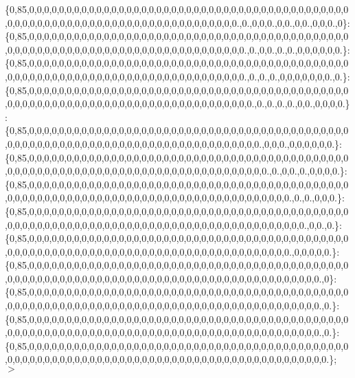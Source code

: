 \{0,85,0,0,0,0,0,0,0,0,0,0,0,0,0,0,0,0,0,0,0,0,0,0,0,0,0,0,0,0,0,0,0,0,0,0,0,0,0,0,0,0,0,0,0,0,0,0,0,0,0,0,0,0,0,0,0,0,0,0,0,0,0,0,0,0,0,0,0,0,0,0,0,0,0,0.,0.,0,0,0.,0,0.,0,0.,0,0,0.,0\}\+: \{0,85,0,0,0,0,0,0,0,0,0,0,0,0,0,0,0,0,0,0,0,0,0,0,0,0,0,0,0,0,0,0,0,0,0,0,0,0,0,0,0,0,0,0,0,0,0,0,0,0,0,0,0,0,0,0,0,0,0,0,0,0,0,0,0,0,0,0,0,0,0,0,0,0,0,0,0.,0.,0,0.,0.,0.,0,0,0,0,0,0.\}\+: \{0,85,0,0,0,0,0,0,0,0,0,0,0,0,0,0,0,0,0,0,0,0,0,0,0,0,0,0,0,0,0,0,0,0,0,0,0,0,0,0,0,0,0,0,0,0,0,0,0,0,0,0,0,0,0,0,0,0,0,0,0,0,0,0,0,0,0,0,0,0,0,0,0,0,0,0,0.,0.,0.,0.,0,0,0,0,0,0,0.,0.\}\+: \{0,85,0,0,0,0,0,0,0,0,0,0,0,0,0,0,0,0,0,0,0,0,0,0,0,0,0,0,0,0,0,0,0,0,0,0,0,0,0,0,0,0,0,0,0,0,0,0,0,0,0,0,0,0,0,0,0,0,0,0,0,0,0,0,0,0,0,0,0,0,0,0,0,0,0,0,0,0.,0.,0.,0.,0.,0,0.,0,0,0,0.\}\+: \{0,85,0,0,0,0,0,0,0,0,0,0,0,0,0,0,0,0,0,0,0,0,0,0,0,0,0,0,0,0,0,0,0,0,0,0,0,0,0,0,0,0,0,0,0,0,0,0,0,0,0,0,0,0,0,0,0,0,0,0,0,0,0,0,0,0,0,0,0,0,0,0,0,0,0,0,0,0,0.,0,0,0.,0,0,0,0,0,0.\}\+: \{0,85,0,0,0,0,0,0,0,0,0,0,0,0,0,0,0,0,0,0,0,0,0,0,0,0,0,0,0,0,0,0,0,0,0,0,0,0,0,0,0,0,0,0,0,0,0,0,0,0,0,0,0,0,0,0,0,0,0,0,0,0,0,0,0,0,0,0,0,0,0,0,0,0,0,0,0,0,0,0.,0.,0,0.,0.,0,0,0,0.\}\+: \{0,85,0,0,0,0,0,0,0,0,0,0,0,0,0,0,0,0,0,0,0,0,0,0,0,0,0,0,0,0,0,0,0,0,0,0,0,0,0,0,0,0,0,0,0,0,0,0,0,0,0,0,0,0,0,0,0,0,0,0,0,0,0,0,0,0,0,0,0,0,0,0,0,0,0,0,0,0,0,0,0,0,0.,0.,0.,0,0,0.\}\+: \{0,85,0,0,0,0,0,0,0,0,0,0,0,0,0,0,0,0,0,0,0,0,0,0,0,0,0,0,0,0,0,0,0,0,0,0,0,0,0,0,0,0,0,0,0,0,0,0,0,0,0,0,0,0,0,0,0,0,0,0,0,0,0,0,0,0,0,0,0,0,0,0,0,0,0,0,0,0,0,0,0,0,0,0,0.,0,0.,0.\}\+: \{0,85,0,0,0,0,0,0,0,0,0,0,0,0,0,0,0,0,0,0,0,0,0,0,0,0,0,0,0,0,0,0,0,0,0,0,0,0,0,0,0,0,0,0,0,0,0,0,0,0,0,0,0,0,0,0,0,0,0,0,0,0,0,0,0,0,0,0,0,0,0,0,0,0,0,0,0,0,0,0,0,0,0.,0,0,0,0,0.\}\+: \{0,85,0,0,0,0,0,0,0,0,0,0,0,0,0,0,0,0,0,0,0,0,0,0,0,0,0,0,0,0,0,0,0,0,0,0,0,0,0,0,0,0,0,0,0,0,0,0,0,0,0,0,0,0,0,0,0,0,0,0,0,0,0,0,0,0,0,0,0,0,0,0,0,0,0,0,0,0,0,0,0,0,0,0,0,0,0.,0\}\+: \{0,85,0,0,0,0,0,0,0,0,0,0,0,0,0,0,0,0,0,0,0,0,0,0,0,0,0,0,0,0,0,0,0,0,0,0,0,0,0,0,0,0,0,0,0,0,0,0,0,0,0,0,0,0,0,0,0,0,0,0,0,0,0,0,0,0,0,0,0,0,0,0,0,0,0,0,0,0,0,0,0,0,0,0,0,0,0.,0.\}\+: \{0,85,0,0,0,0,0,0,0,0,0,0,0,0,0,0,0,0,0,0,0,0,0,0,0,0,0,0,0,0,0,0,0,0,0,0,0,0,0,0,0,0,0,0,0,0,0,0,0,0,0,0,0,0,0,0,0,0,0,0,0,0,0,0,0,0,0,0,0,0,0,0,0,0,0,0,0,0,0,0,0,0,0,0,0,0,0.,0.\}\+: \{0,85,0,0,0,0,0,0,0,0,0,0,0,0,0,0,0,0,0,0,0,0,0,0,0,0,0,0,0,0,0,0,0,0,0,0,0,0,0,0,0,0,0,0,0,0,0,0,0,0,0,0,0,0,0,0,0,0,0,0,0,0,0,0,0,0,0,0,0,0,0,0,0,0,0,0,0,0,0,0,0,0,0,0,0,0,0,0.\}; $>$ 
